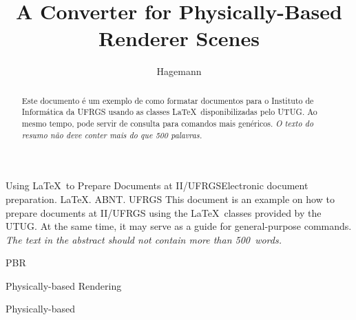 \documentclass[cic,tc,english]{iiufrgs}
\title{A Converter for Physically-Based Renderer Scenes}
\author{Hagemann}{Luiza de Azambuja}
\begin{document}
\maketitle




\begin{abstract}
    Este documento é um exemplo de como formatar documentos para o
    Instituto de Informática da UFRGS usando as classes \LaTeX\
    disponibilizadas pelo UTUG\@. Ao mesmo tempo, pode servir de consulta
    para comandos mais genéricos. \emph{O texto do resumo não deve
      conter mais do que 500 palavras.}
\end{abstract}

\begin{englishabstract}{Using \LaTeX\ to Prepare Documents at II/UFRGS}{Electronic document preparation. \LaTeX. ABNT. UFRGS}
    This document is an example on how to prepare documents at II/UFRGS
    using the \LaTeX\ classes provided by the UTUG\@. At the same time, it
    may serve as a guide for general-purpose commands. \emph{The text in
      the abstract should not contain more than 500~words.}
\end{englishabstract}



\begin{listofabbrv}{PBR}
    \item[PBR] Physically-based Rendering
    \item[PB] Physically-based
\end{listofabbrv}
\end{document}
